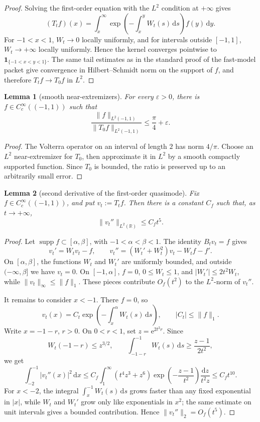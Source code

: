 \documentclass[11pt]{article}
\newtheorem{lemma}{Lemma}
\newcommand{\R}{\mathbb R}
\newcommand{\supp}{\operatorname{supp}}
\newcommand{\e}{\mathrm e}
\newcommand{\dd}{\mathrm d}
\begin{document}
\begin{proof}
Solving the first-order equation with the \(L^2\) condition at \(+\infty\)
gives
\[
    (T_t f)(x)=\int_x^\infty
       \exp\!\left(-\int_x^y W_t(s)\,\dd s\right) f(y)\,\dd y.
\]
For \(-1<x<1\), \(W_t\to0\) locally uniformly, and for intervals outside
\([-1,1]\), \(W_t\to+\infty\) locally uniformly.  Hence the kernel converges
pointwise to \(\mathbf 1_{\{-1<x<y<1\}}\).  The same tail estimates as in the
standard proof of the fast-model packet give convergence in Hilbert--Schmidt
norm on the support of \(f\), and therefore \(T_tf\to T_0f\) in \(L^2\).
\end{proof}

\begin{lemma}[smooth near-extremizers]\label{lem:near-ext}
For every \(\varepsilon>0\), there is \(f\in C_c^\infty((-1,1))\) such that
\[
    \frac{\|f\|_{L^2(-1,1)}}{\|T_0f\|_{L^2(-1,1)}}\le \frac\pi4+\varepsilon.
\]
\end{lemma}

\begin{proof}
The Volterra operator on an interval of length \(2\) has norm \(4/\pi\).
Choose an \(L^2\) near-extremizer for \(T_0\), then approximate it in \(L^2\)
by a smooth compactly supported function.  Since \(T_0\) is bounded, the ratio
is preserved up to an arbitrarily small error.
\end{proof}

\begin{lemma}[second derivative of the first-order quasimode]\label{lem:vpp}
Fix \(f\in C_c^\infty((-1,1))\), and put \(v_t:=T_tf\).  Then there is a
constant \(C_f\) such that, as \(t\to+\infty\),
\[
    \|v_t''\|_{L^2(\R)}\le C_f t^5.
\]
\end{lemma}

\begin{proof}
Let \(\supp f\subset[\alpha,\beta]\), with \(-1<\alpha<\beta<1\).  The
identity \(B_tv_t=f\) gives
\[
    v_t'=W_tv_t-f,\qquad
    v_t''=(W_t'+W_t^2)v_t-W_tf-f'.
\]
On \([\alpha,\beta]\), the functions \(W_t\) and \(W_t'\) are uniformly
bounded, and outside \((-\infty,\beta]\) we have \(v_t=0\).  On
\([-1,\alpha]\), \(f=0\), \(0\le W_t\le1\), and \(|W_t'|\le 2t^2W_t\), while
\(\|v_t\|_\infty\le \|f\|_1\).  These pieces contribute \(O_f(t^2)\) to the
\(L^2\)-norm of \(v_t''\).

It remains to consider \(x<-1\).  There \(f=0\), so
\[
    v_t(x)=C_t\exp\!\left(-\int_x^\alpha W_t(s)\,\dd s\right),
    \qquad |C_t|\le \|f\|_1.
\]
Write \(x=-1-r\), \(r>0\).  On \(0<r<1\), set \(z=\e^{2t^2r}\).  Since
\[
    W_t(-1-r)\le z^{3/2},\qquad
    \int_{-1-r}^{-1}W_t(s)\,\dd s
       \ge \frac{z-1}{2t^2},
\]
we get
\[
    \int_{-2}^{-1}|v_t''(x)|^2\,\dd x
       \le C_f\int_1^\infty
          (t^4z^3+z^6)\exp\!\left(-\frac{z-1}{t^2}\right)
          \frac{\dd z}{t^2z}
       \le C_f t^{10}.
\]
For \(x<-2\), the integral \(\int_x^{-1}W_t(s)\,\dd s\) grows faster than any
fixed exponential in \(|x|\), while \(W_t\) and \(W_t'\) grow only like
exponentials in \(x^2\); the same estimate on unit intervals gives a bounded
contribution.  Hence \(\|v_t''\|_2=O_f(t^5)\).
\end{proof}
\end{document}
